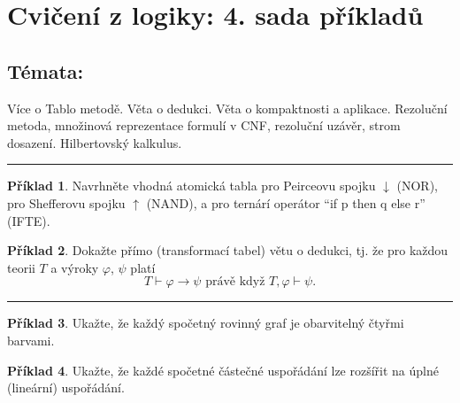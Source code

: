 \documentclass{amsart}
\theoremstyle{definition}
\newtheorem{problem}{Příklad}
\begin{document}
\section*{Cvičení z logiky: 4. sada příkladů}

\bigskip\bigskip\bigskip

\subsection*{Témata:} Více o Tablo metodě. Věta o dedukci. Věta o kompaktnosti a aplikace. Rezoluční metoda, množinová reprezentace formulí v CNF, rezoluční uzávěr, strom dosazení. Hilbertovský kalkulus.

\medskip\hrule

\begin{problem} Navrhněte vhodná atomická tabla pro Peirceovu spojku $\downarrow$ (NOR), pro Shefferovu spojku $\uparrow$ (NAND), a pro ternárí operátor ``if p then q else r'' (IFTE).
\end{problem}\medskip

\begin{problem}
Dokažte přímo (transformací tabel) větu o dedukci, tj. že pro každou teorii $T$ a výroky $\varphi$, $\psi$ platí
$$T \vdash \varphi\to \psi\text{\ \ právě když\ \ }T,\varphi \vdash \psi.$$
\end{problem}\medskip


\hrule

\begin{problem}
Ukažte, že každý spočetný rovinný graf je obarvitelný čtyřmi barvami.
\end{problem}\medskip

\begin{problem}
Ukažte, že každé spočetné částečné uspořádání lze rozšířit na úplné (lineární) uspořádání.
\end{problem}\medskip

\end{document}
